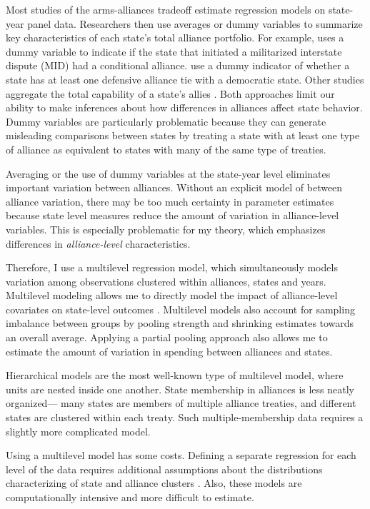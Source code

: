 \documentclass[12pt]{article}
\begin{document}
Most studies of the arms-alliances tradeoff estimate regression models on state-year panel data. Researchers then use averages or dummy variables to summarize key characteristics of each state's total alliance portfolio. For example, \citet{Benson2012} uses a dummy variable to indicate if the state that initiated a militarized interstate dispute (MID) had a conditional alliance. \citet{DigiuseppePoast2016} use a dummy indicator of whether a state has at least one defensive alliance tie with a democratic state. Other studies aggregate the total capability of a state's allies \citep{Nordhausetal2012}. Both approaches limit our ability to make inferences about how differences in alliances affect state behavior. Dummy variables are particularly problematic because they can generate misleading comparisons between states by treating a state with at least one type of alliance as equivalent to states with many of the same type of treaties. 

Averaging or the use of dummy variables at the state-year level eliminates important variation between alliances. Without an explicit model of between alliance variation, there may be too much certainty in parameter estimates \citep{McElreath2016} because state level measures reduce the amount of variation in alliance-level variables. This is especially problematic for my theory, which emphasizes differences in \textit{alliance-level} characteristics. 

Therefore, I use a multilevel regression model, which simultaneously models variation among observations clustered within alliances, states and years. Multilevel modeling allows me to directly model the impact of alliance-level covariates on state-level outcomes \citep{GelmanHill2007}. Multilevel models also account for sampling imbalance between groups by pooling strength and shrinking estimates towards an overall average. Applying a partial pooling approach also allows me to estimate the amount of variation in spending between alliances and states. 

Hierarchical models are the most well-known type of multilevel model, where units are nested inside one another. State membership in alliances is less neatly organized--- many states are members of multiple alliance treaties, and different states are clustered within each treaty. Such multiple-membership data requires a slightly more complicated model. 

Using a multilevel model has some costs. Defining a separate regression for each level of the data requires additional assumptions about the distributions characterizing of state and alliance clusters \citep{McElreath2016}. Also, these models are computationally intensive and more difficult to estimate.
\end{document}
